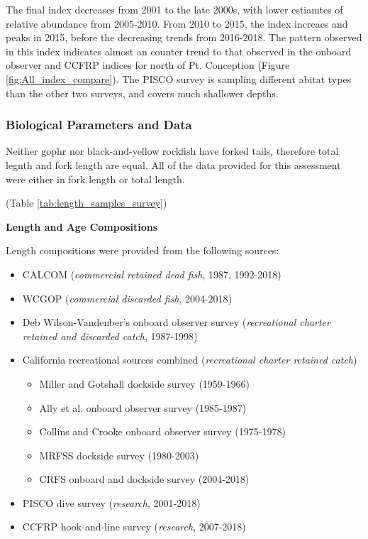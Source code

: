 \documentclass[12pt,]{article}
\begin{document}
The final index decreases from 2001 to the late 2000s, with lower
estiamtes of relative abundance from 2005-2010. From 2010 to 2015, the
index increaes and peaks in 2015, before the decreasing trends from
2016-2018. The pattern observed in this index indicates almost an
counter trend to that observed in the onboard observer and CCFRP indices
for north of Pt. Conception (Figure \ref{fig:All_index_compare}). The
PISCO survey is sampling different abitat types than the other two
surveys, and covers much shallower depths.

\subsubsection{Biological Parameters and
Data}\label{biological-parameters-and-data}

Neither gophr nor black-and-yellow rockfish have forked tails, therefore
total legnth and fork length are equal. All of the data provided for
this assessment were either in fork length or total length.

(Table \ref{tab:length_samples_survey})

\textbf{Length and Age Compositions}

Length compositions were provided from the following sources:

\begin{itemize}[noitemsep,nolistsep,topsep=0pt]
  \item CALCOM (\emph{commercial retained dead fish}, 1987, 1992-2018)   
  \item WCGOP (\emph{commercial discarded fish}, 2004-2018)    
  \item Deb Wilson-Vandenber's onboard observer survey (\emph{recreational charter retained and discarded catch}, 1987-1998)
  \item California recreational sources combined (\emph{recreational charter retained catch})     
    \begin{itemize}[noitemsep,nolistsep]
      \item Miller and Gotshall dockside survey (1959-1966)    
      \item Ally  et al. onboard observer survey (1985-1987)
      \item Collins and Crooke onboard observer survey (1975-1978)     
      \item MRFSS dockside survey (1980-2003)     
      \item CRFS onboard and dockside survey (2004-2018)
    \end{itemize}
 \item PISCO dive survey (\emph{research}, 2001-2018)      
 \item CCFRP hook-and-line survey (\emph{research}, 2007-2018)        
\end{itemize}
\end{document}
